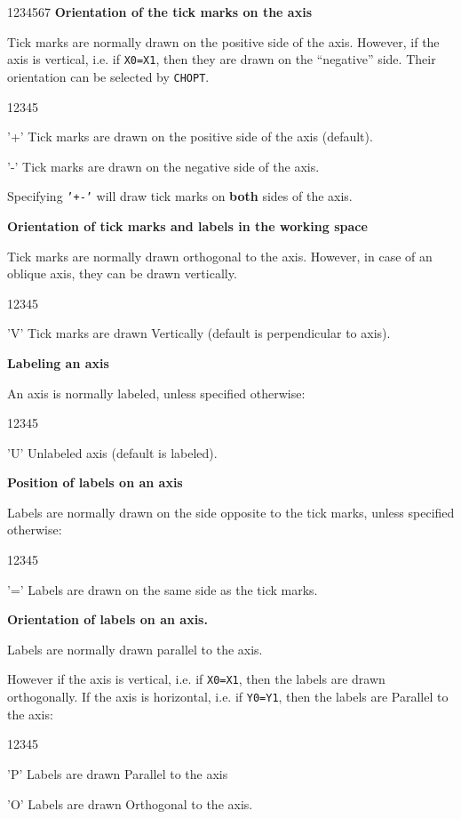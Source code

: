 \begin{DLtt}{1234567}
{\bf Orientation of the tick marks on the axis }
 
Tick marks are normally drawn on the positive side of the axis. However, if the
axis is vertical, i.e. if {\tt X0=X1}, then they are drawn on the ``negative''
side. Their orientation can be selected by {\tt CHOPT}.
\begin{DLtt}{12345}
\item['+'] Tick marks are drawn on the positive side of the axis (default).
\item['-'] Tick marks are drawn on the negative side of the axis.
\end{DLtt}
Specifying {\tt'+-'} will draw tick marks on {\bf both} sides of the axis.
 
{\bf Orientation of tick marks and labels in the working space }
 
Tick marks are normally drawn orthogonal to the axis.
However, in case of an oblique axis, they can be drawn vertically.
\begin{DLtt}{12345}
\item['V'] Tick marks are drawn Vertically (default is perpendicular to axis).
\end{DLtt}
 
\newpage
{\bf Labeling an axis }
 
An axis is normally labeled, unless specified otherwise:
\begin{DLtt}{12345}
\item['U'] Unlabeled axis (default is labeled).
\end{DLtt}
 
{\bf Position of labels on an axis }
 
Labels are normally drawn on the side opposite to the tick marks,
unless specified otherwise:
\begin{DLtt}{12345}
\item['='] Labels are drawn on the same side as the tick marks.
\end{DLtt}
 
{\bf Orientation of labels on an axis. }
 
Labels are normally drawn parallel to the axis.
 
However if the axis is vertical, i.e.
if {\tt X0=X1}, then the labels are drawn
orthogonally. If the axis is horizontal, i.e. if {\tt Y0=Y1}, then the
labels are Parallel to the axis:
\begin{DLtt}{12345}
\item['P'] Labels are drawn Parallel to the axis
\item['O'] Labels are drawn Orthogonal to the axis.
\end{DLtt}
 

\end{DLtt}
